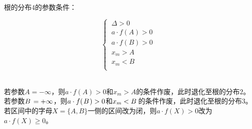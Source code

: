 \documentclass[UTF8]{ctexart}
\begin{document}
    根的分布$4$的参数条件：
    \begin{large}
        \begin{equation*}
            \begin{cases}
                ~\Delta>0\\[1mm]
                ~a\cdot f(A)>0\\[1mm]
                ~a\cdot f(B)>0\\[1mm]
                ~x_m>A\\[1mm]
                ~x_m<B\\[1mm]
            \end{cases}
        \end{equation*}
    \end{large}\\
    若参数$A=-\infty$，则$a\cdot f(A)>0$和$x_m>A$的条件作废，此时退化至根的分布$2$。\\[3mm]
    若参数$B\hspace{1.5pt}=+\infty$，则$a\cdot f(\hspace{1.0pt}B\hspace{1.0pt})>0$和$x_m<B\hspace{1.5pt}$的条件作废，此时退化至根的分布$3$。\\[3mm]
    若区间中的字母$X=\{A,B\}$一侧的区间改为闭，则$a\cdot f(X)>0$改为$a\cdot f(X)\geq 0$。

\newpage
\end{document}
